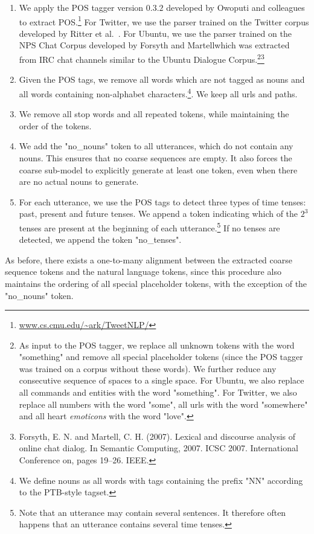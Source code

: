 \documentclass{article}
\begin{document}
\begin{enumerate}
\item We apply the POS tagger version $0.3.2$ developed by Owoputi and colleagues~\cite{owoputi2013improved} to extract POS.\footnote{\url{www.cs.cmu.edu/~ark/TweetNLP/}} For Twitter, we use the parser trained on the Twitter corpus developed by Ritter et al.~\cite{Ritter:2011:NER:2145432.2145595}. 
For Ubuntu, we use the parser trained on the NPS Chat Corpus developed by Forsyth and Martellwhich was extracted from IRC chat channels similar to the Ubuntu Dialogue Corpus.\footnote{As input to the POS tagger, we replace all unknown tokens with the word "something" and remove all special placeholder tokens (since the POS tagger was trained on a corpus without these words). We further reduce any consecutive sequence of spaces to a single space. For Ubuntu, we also replace all commands and entities with the word "something". For Twitter, we also replace all numbers with the word "some", all urls with the word "somewhere" and all heart \textit{emoticons} with the word "love".}\footnote{Forsyth, E. N. and Martell, C. H. (2007). Lexical and discourse analysis of online chat dialog. In Semantic
Computing, 2007. ICSC 2007. International Conference on, pages 19–26. IEEE.}
\item Given the POS tags, we remove all words which are not tagged as nouns and all words containing non-alphabet characters.\footnote{We define nouns as all words with tags containing the prefix "NN" according to the PTB-style tagset.}. We keep all urls and paths.
\item We remove all stop words and all repeated tokens, while maintaining the order of the tokens.
\item We add the "no\_nouns" token to all utterances, which do not contain any nouns. This ensures that no coarse sequences are empty. It also forces the coarse sub-model to explicitly generate at least one token, even when there are no actual nouns to generate.
\item For each utterance, we use the POS tags to detect three types of time tenses: past, present and future tenses. We append a token indicating which of the $2^3$ tenses are present at the beginning of each utterance.\footnote{Note that an utterance may contain several sentences. It therefore often happens that an utterance contains several time tenses.} If no tenses are detected, we append the token "no\_tenses".
\end{enumerate}

As before, there exists a one-to-many alignment between the extracted coarse sequence tokens and the natural language tokens, since this procedure also maintains the ordering of all special placeholder tokens, with the exception of the "no\_nouns" token.
\end{document}
